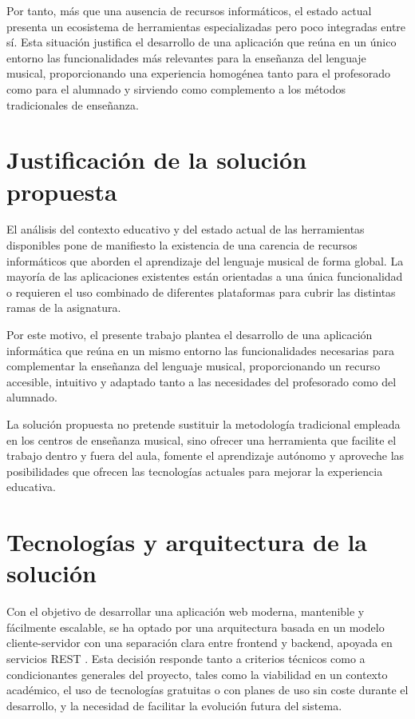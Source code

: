Por tanto, más que una ausencia de recursos informáticos, el estado actual presenta un ecosistema de herramientas especializadas pero poco integradas entre sí. Esta situación justifica el desarrollo de una aplicación que reúna en un único entorno las funcionalidades más relevantes para la enseñanza del lenguaje musical, proporcionando una experiencia homogénea tanto para el profesorado como para el alumnado y sirviendo como complemento a los métodos tradicionales de enseñanza.
\section{Justificación de la solución propuesta}

El análisis del contexto educativo y del estado actual de las herramientas disponibles pone de manifiesto la existencia de una carencia de recursos informáticos que aborden el aprendizaje del lenguaje musical de forma global. La mayoría de las aplicaciones existentes están orientadas a una única funcionalidad o requieren el uso combinado de diferentes plataformas para cubrir las distintas ramas de la asignatura.

Por este motivo, el presente trabajo plantea el desarrollo de una aplicación informática que reúna en un mismo entorno las funcionalidades necesarias para complementar la enseñanza del lenguaje musical, proporcionando un recurso accesible, intuitivo y adaptado tanto a las necesidades del profesorado como del alumnado.

La solución propuesta no pretende sustituir la metodología tradicional empleada en los centros de enseñanza musical, sino ofrecer una herramienta que facilite el trabajo dentro y fuera del aula, fomente el aprendizaje autónomo y aproveche las posibilidades que ofrecen las tecnologías actuales para mejorar la experiencia educativa.
\section{Tecnologías y arquitectura de la solución}
\label{sec:plan}

Con el objetivo de desarrollar una aplicación web moderna, mantenible y fácilmente escalable, se ha optado por una arquitectura basada en un modelo cliente-servidor \cite{Tanenbaum2007} con una separación clara entre frontend y backend, apoyada en servicios REST \cite{PostmanREST}. Esta decisión responde tanto a criterios técnicos como a condicionantes generales del proyecto, tales como la viabilidad en un contexto académico, el uso de tecnologías gratuitas o con planes de uso sin coste durante el desarrollo, y la necesidad de facilitar la evolución futura del sistema.

